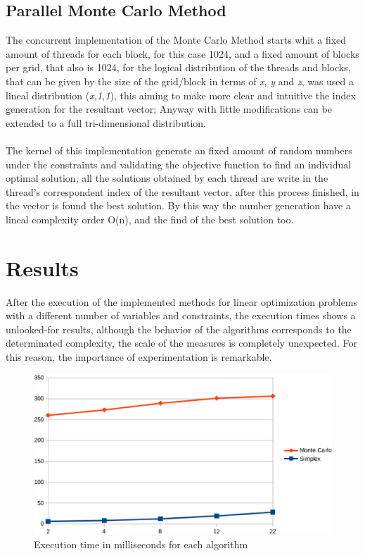 \documentclass[runningheads]{llncs}
\begin{document}
\subsection{Parallel Monte Carlo Method}
The concurrent implementation of the Monte Carlo Method starts whit a fixed amount of threads for each block, for this case 1024, and a fixed amount of blocks per grid, that also is 1024, for the logical distribution of the threads and blocks, that can be given by the size of the grid/block in terms of \textit x, \textit y and \textit z, was used a lineal distribution (\textit{x,1,1}), this aiming to make more clear and intuitive the index generation for the resultant vector; Anyway with little modifications can be extended to a full tri-dimensional distribution.

\paragraph{}
The kernel of this implementation generate an fixed amount of random numbers under the constraints and validating the objective function to find an individual optimal solution, all the solutions obtained by each thread are write in the thread's correspondent index of the resultant vector, after this process finished, in the vector is found the best solution.
By this way the number generation have a lineal complexity order O(n), and the find of the best solution too.

\section{Results}
After the execution of the implemented methods for linear optimization problems with a different number of variables and constraints, the execution times shows a unlooked-for results, although the behavior of the algorithms corresponds to the determinated complexity, the scale of the measures is completely unexpected. 
For this reason, the importance of experimentation is remarkable.

\begin{figure}
\includegraphics[width=\textwidth]{fig1.eps}
\caption{Execution time in milliseconds for each algorithm} \label{fig1}
\end{figure}
\end{document}

